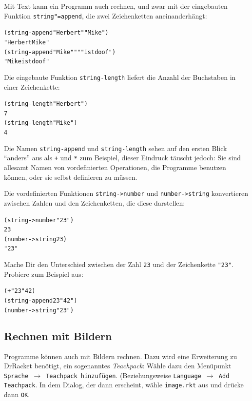 Mit Text kann ein Programm auch rechnen, und zwar mit der eingebauten
Funktion
\texttt{string"=append},
die zwei Zeichenketten aneinanderhängt:
%
\begin{alltt}
(string-append "Herbert" "Mike")
\evalsto{} "HerbertMike"
(string-append "Mike" " " "ist doof")
\evalsto{} "Mike ist doof"
\end{alltt}
%
Die eingebaute Funktion
\texttt{string-length}
liefert die Anzahl der Buchstaben in einer Zeichenkette:
%
\begin{alltt}
(string-length "Herbert")
\evalsto{} 7
(string-length "Mike")
\evalsto{} 4
\end{alltt}
%
Die Namen \texttt{string-append} und \texttt{string-length} sehen auf
den ersten Blick "`anders"' aus als \texttt{+} und \texttt{*} zum
Beispiel, dieser Eindruck täuscht jedoch: Sie sind allesamt Namen von
vordefinierten Operationen, die Programme benutzen können, oder sie
selbst definieren zu müssen.

Die vordefinierten Funktionen
\texttt{string->number}
und \texttt{number->string} konvertieren zwischen Zahlen und den
Zeichenketten, die diese darstellen:
%
\begin{alltt}
(string->number "23")
\evalsto{} 23
(number->string 23)
\evalsto{} "23"
\end{alltt}
%
\begin{aufgabe}
  Mache Dir den Unterschied zwischen der Zahl \texttt{23} und der
  Zeichenkette \verb|"23"|.  Probiere zum Beispiel aus:
\begin{alltt}
(+ "23" 42)
(string-append 23 "42")
(number->string "23")
\end{alltt}
\end{aufgabe}

\subsection{Rechnen mit Bildern}

Programme können auch mit Bildern rechnen.  Dazu wird eine Erweiterung
zu DrRacket benötigt, ein sogenanntes
\textit{Teachpack}: Wähle dazu den Menüpunkt
\texttt{Sprache $\rightarrow$ Teachpack hinzufügen}.  (Beziehungsweise
\texttt{Language $\rightarrow$ Add Teachpack}.  In dem Dialog, der
dann erscheint, wähle \texttt{image.rkt} aus und drücke dann
\texttt{OK}.

